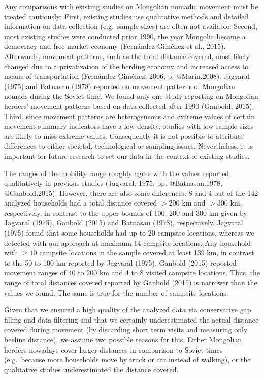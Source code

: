 \documentclass[]{elsarticle} %
\begin{document}
Any comparisons with existing studies on Mongolian nomadic movement must
be treated cautiously: First, existing studies use qualitative methods
and detailed information on data collection (e.g.~sample sizes) are
often not available. Second, most existing studies were conducted prior
1990, the year Mongolia became a democracy and free-market economy
(Fernández-Giménez et al., 2015). Afterwards, movement patterns, such as
the total distance covered, most likely changed due to a privatization
of the herding economy and increased access to means of transportation
(Fernández-Giménez, 2006, p. @Marin.2008). Jagvaral (1975) and Batnasan
(1978) reported on movement patterns of Mongolian nomads during the
Soviet time. We found only one study reporting on Mongolian herders'
movement patterns based on data collected after 1990 (Ganbold, 2015).
Third, since movement patterns are heterogeneous and extreme values of
certain movement summary indicators have a low density, studies with low
sample sizes are likely to miss extreme values. Consequently it is not
possible to attribute differences to either societal, technological or
sampling issues. Nevertheless, it is important for future research to
set our data in the context of existing studies.

The ranges of the mobility range roughly agree with the values reported
qualitatively in previous studies (Jagvaral, 1975, pp. @Batnasan.1978,
@Ganbold.2015). However, there are also some differences: 8 and 4 out of
the 142 analyzed households had a total distance covered \(>200\) km and
\(>300\) km, respectively, in contrast to the upper bounds of 100, 200
and 300 km given by Jagvaral (1975), Ganbold (2015) and Batnasan (1978),
respectively. Jagvaral (1975) found that some households had up to 20
campsite locations, whereas we detected with our approach at maximum 14
campsite locations. Any household with \(\ge10\) campsite locations in
the sample covered at least 139 km, in contrast to the 50 to 100 km
reported by Jagvaral (1975). Ganbold (2015) reported movement ranges of
40 to 200 km and 4 to 8 visited campsite locations. Thus, the range of
total distances covered reported by Ganbold (2015) is narrower than the
values we found. The same is true for the number of campsite locations.

Given that we ensured a high quality of the analyzed data via
conservative gap filling and data filtering and that we certainly
underestimated the actual distance covered during movement (by
discarding short term visits and measuring only beeline distance), we
assume two possible reasons for this. Either Mongolian herders nowadays
cover larger distances in comparison to Soviet times (e.g.~because more
households move by truck or car instead of walking), or the qualitative
studies underestimated the distance covered.
\end{document}

